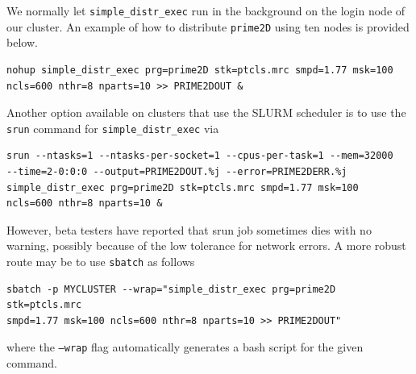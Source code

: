 \documentclass[a4paper,11pt]{article}
\newcommand{\prgname}[1]{\textcolor{NavyBlue}{\texttt{#1}}}
\begin{document}
We normally let \prgname{simple\_distr\_exec} run in the background on the login node of our cluster. An example of how to distribute \prgname{prime2D} using ten nodes is provided below.
\begin{Verbatim}[commandchars=+\[\],fontsize=\small,breaklines=true]
nohup simple_distr_exec prg=prime2D stk=ptcls.mrc smpd=1.77 msk=100
ncls=600 nthr=8 nparts=10 >> PRIME2DOUT &
\end{Verbatim}
Another option available on clusters that use the SLURM scheduler is to use the \texttt{srun} command for \prgname{simple\_distr\_exec} via
\begin{Verbatim}[commandchars=+\[\],fontsize=\small,breaklines=true]
srun --ntasks=1 --ntasks-per-socket=1 --cpus-per-task=1 --mem=32000 
--time=2-0:0:0 --output=PRIME2DOUT.%j --error=PRIME2DERR.%j
simple_distr_exec prg=prime2D stk=ptcls.mrc smpd=1.77 msk=100
ncls=600 nthr=8 nparts=10 &
\end{Verbatim}
However, beta testers have reported that srun job sometimes dies with no warning, possibly because of the low tolerance for network errors. A more robust route may be to use \texttt{sbatch} as follows
\begin{Verbatim}[commandchars=+\[\],fontsize=\small,breaklines=true]
sbatch -p MYCLUSTER --wrap="simple_distr_exec prg=prime2D stk=ptcls.mrc 
smpd=1.77 msk=100 ncls=600 nthr=8 nparts=10 >> PRIME2DOUT"
\end{Verbatim}
where the \texttt{--wrap} flag automatically generates a bash script for the given command.
\end{document}
